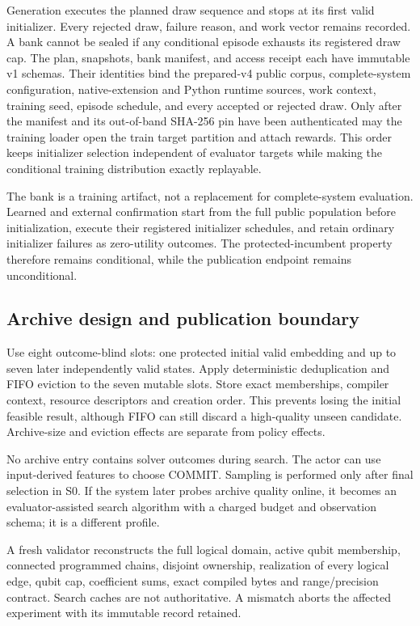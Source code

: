 Generation executes the planned draw sequence and stops at its first valid initializer. Every rejected draw, failure reason, and work vector remains recorded. A bank cannot be sealed if any conditional episode exhausts its registered draw cap. The plan, snapshots, bank manifest, and access receipt each have immutable v1 schemas. Their identities bind the prepared-v4 public corpus, complete-system configuration, native-extension and Python runtime sources, work context, training seed, episode schedule, and every accepted or rejected draw. Only after the manifest and its out-of-band SHA-256 pin have been authenticated may the training loader open the train target partition and attach rewards. This order keeps initializer selection independent of evaluator targets while making the conditional training distribution exactly replayable.

The bank is a training artifact, not a replacement for complete-system evaluation. Learned and external confirmation start from the full public population before initialization, execute their registered initializer schedules, and retain ordinary initializer failures as zero-utility outcomes. The protected-incumbent property therefore remains conditional, while the publication endpoint remains unconditional.

\subsection{Archive design and publication boundary}
Use eight outcome-blind slots: one protected initial valid embedding and up to seven later independently valid states. Apply deterministic deduplication and FIFO eviction to the seven mutable slots. Store exact memberships, compiler context, resource descriptors and creation order. This prevents losing the initial feasible result, although FIFO can still discard a high-quality unseen candidate. Archive-size and eviction effects are separate from policy effects.

No archive entry contains solver outcomes during search. The actor can use input-derived features to choose COMMIT. Sampling is performed only after final selection in S0. If the system later probes archive quality online, it becomes an evaluator-assisted search algorithm with a charged budget and observation schema; it is a different profile.

A fresh validator reconstructs the full logical domain, active qubit membership, connected programmed chains, disjoint ownership, realization of every logical edge, qubit cap, coefficient sums, exact compiled bytes and range/precision contract. Search caches are not authoritative. A mismatch aborts the affected experiment with its immutable record retained.

